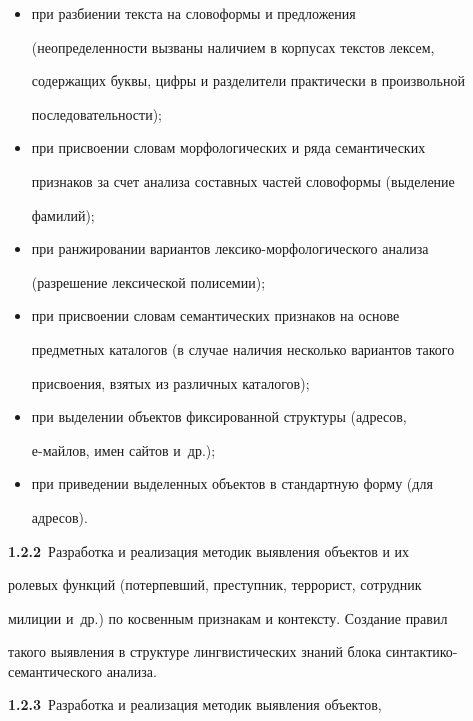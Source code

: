    \begin{itemize}


   \item при разбиении текста на словоформы и предложения 


(неопределенности вызваны  наличием в корпусах текстов лексем, 


содержащих буквы, цифры и разделители практически в произвольной 


последовательности); 


   \item при присвоении словам морфологических и ряда семантических 


признаков за счет анализа составных частей словоформы (выделение 


фамилий);  


   \item при ранжировании вариантов лексико-морфологического анализа  


(разрешение лексической полисемии);


   \item при присвоении словам семантических признаков на основе 


предметных каталогов (в случае наличия несколько вариантов такого 


присвоения, взятых из различных каталогов);


   \item при выделении объектов фиксированной структуры (адресов, 


   е-майлов, имен сайтов и~др.);


   \item при приведении выделенных объектов в стандартную форму (для 


адресов).


   \end{itemize}


   


   \textbf{1.2.2}\ Разработка и реализация методик выявления объектов и их 


ролевых функций (потерпевший, преступник, террорист, сотрудник 


милиции и~др.) по косвенным признакам и контексту. Создание правил 


такого выявления в структуре лингвистических знаний блока синтактико-семантического анализа.   


   


   \textbf{1.2.3}\ Разработка и реализация методик выявления объектов, 


